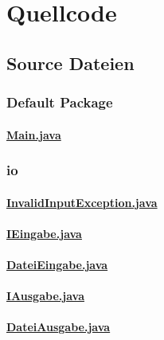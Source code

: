 \chapter{Quellcode}
\label{Quellcode}
\section{Source Dateien}
\subsection{Default Package}
\subsubsection{\underline{Main.java}}

\clearpage
%
\subsection{io}
\subsubsection{\underline{InvalidInputException.java}}

\clearpage
%
\subsubsection{\underline{IEingabe.java}}

\clearpage
%
\subsubsection{\underline{DateiEingabe.java}}

\clearpage
%
\subsubsection{\underline{IAusgabe.java}}

\clearpage
%
\subsubsection{\underline{DateiAusgabe.java}}

\clearpage
%
